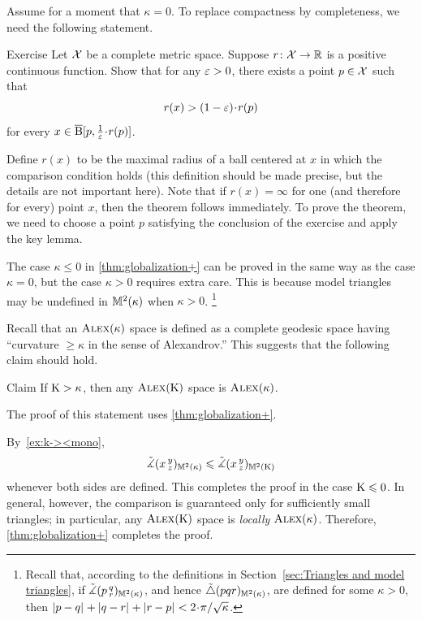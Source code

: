 Assume for a moment that $\kappa=0$.
To replace compactness by completeness, we need the following statement.

\begin{thm}{Exercise}\label{ex:alm-min}
Let $\mathcal{X}$ be a complete metric space.
Suppose $r\colon\mathcal{X}\to \mathbb{R}$ is a positive continuous function.
Show that for any $\varepsilon>0$, there exists a point $p\in \mathcal{X}$ such that
\[
r(x)> (1-\eps)\cdot r(p)
\]
for every $x\in \cBall[p,\tfrac{1}{\eps}\cdot r(p)]$.

\end{thm}

Define $r(x)$ to be the maximal radius of a ball centered at $x$ in which the comparison condition holds (this definition should be made precise, but the details are not important here).
Note that if $r(x)=\infty$ for one (and therefore for every) point $x$, then the theorem follows immediately.
To prove the theorem, we need to choose a point $p$ satisfying the conclusion of the exercise and apply the key lemma.

The case $\kappa\le 0$ in \ref{thm:globalization+} can be proved in the same way as the case $\kappa=0$, but the case $\kappa>0$ requires extra care.
This is because model triangles may be undefined in $\mathbb{M}^2(\kappa)$ when $\kappa>0$.%
\footnote{Recall that, according to the definitions in Section~\ref{sec:Triangles and model triangles},
if $\tilde\measuredangle(p\,{}^{q}_{r})_{\mathbb{M}^2(\kappa)}$, and hence $\tilde\triangle(p q r)_{\mathbb{M}^2(\kappa)}$, are defined for some $\kappa>0$, then
$\dist{p}{q}{}+\dist{q}{r}{}+\dist{r}{p}{}< 2\cdot\pi/\sqrt{\kappa}$.}

Recall that an $\textup{\textsc{Alex}}(\kappa)$ space is defined as a complete geodesic space having ``curvature $\ge\kappa$ in the sense of Alexandrov.''
This suggests that the following claim should hold.

\begin{thm}{Claim}\label{clm:K>k}
If $\mathrm{K}>\kappa$, then any $\textup{\textsc{Alex}}(\mathrm{K})$ space is $\textup{\textsc{Alex}}(\kappa)$.
\end{thm}

The proof of this statement uses \ref{thm:globalization+}.

By~\ref{ex:k-><mono},
\[
\tilde\measuredangle(x\,{}^{y}_{z})_{\mathbb{M}^2(\kappa)}\leqslant \tilde\measuredangle(x\,{}^{y}_{z})_{\mathbb{M}^2(\mathrm{K})}
\]
whenever both sides are defined.
This completes the proof in the case $\mathrm{K}\leqslant 0$.
In general, however, the comparison is guaranteed only for sufficiently small triangles;
in particular, any $\textup{\textsc{Alex}}(\mathrm{K})$ space is \emph{locally} $\textup{\textsc{Alex}}(\kappa)$.
Therefore, \ref{thm:globalization+} completes the proof.
\qeds

